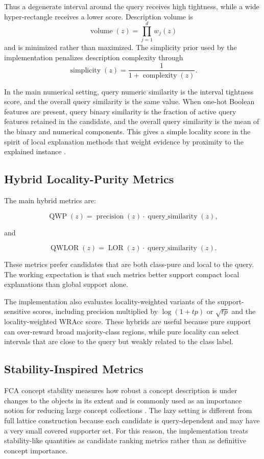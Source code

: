 \documentclass[11pt]{article}
\begin{document}
Thus a degenerate interval around the query receives high tightness, while a
wide hyper-rectangle receives a lower score. Description volume is
\[
    \operatorname{volume}(z)=\prod_{j=1}^{d} w_j(z)
\]
and is minimized rather than maximized. The simplicity prior used by the
implementation penalizes description complexity through
\[
    \operatorname{simplicity}(z)=
    \frac{1}{1+\operatorname{complexity}(z)}.
\]

In the main numerical setting, query numeric similarity is the interval
tightness score, and the overall query similarity is the same value. When
one-hot Boolean features are present, query binary similarity is the fraction
of active query features retained in the candidate, and the overall query
similarity is the mean of the binary and numerical components. This gives a
simple locality score in the spirit of local explanation methods that weight
evidence by proximity to the explained instance \cite{ribeiro2016should}.

\subsection{Hybrid Locality-Purity Metrics}

The main hybrid metrics are:

\[
    \operatorname{QWP}(z) =
    \operatorname{precision}(z) \cdot \operatorname{query\_similarity}(z),
\]

and

\[
    \operatorname{QWLOR}(z) =
    \operatorname{LOR}(z) \cdot \operatorname{query\_similarity}(z).
\]

These metrics prefer candidates that are both class-pure and local to the
query. The working expectation is that such metrics better support compact
local explanations than global support alone.

The implementation also evaluates locality-weighted variants of the
support-sensitive scores, including precision multiplied by $\log(1+tp)$ or
$\sqrt{tp}$ and the locality-weighted WRAcc score. These hybrids are useful
because pure support can over-reward broad majority-class regions, while pure
locality can select intervals that are close to the query but weakly related
to the class label.

\subsection{Stability-Inspired Metrics}

FCA concept stability measures how robust a concept description is under
changes to the objects in its extent and is commonly used as an importance
notion for reducing large concept collections \cite{kuznetsov2009concept}.
The lazy setting is different from full lattice construction because each
candidate is query-dependent and may have a very small covered supporter
set. For this reason, the implementation treats stability-like quantities as
candidate ranking metrics rather than as definitive concept importance.
\end{document}
